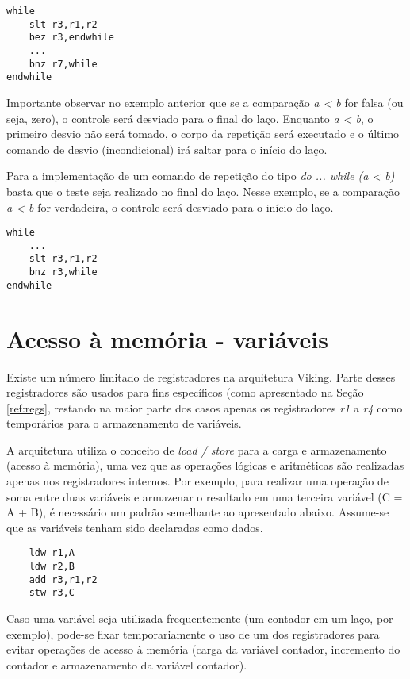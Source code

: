 \documentclass{extreport}
\begin{document}
\begin{verbatim}
while
    slt r3,r1,r2
    bez r3,endwhile
    ...
    bnz r7,while
endwhile
\end{verbatim}

Importante observar no exemplo anterior que se a comparação \textit{a < b} for falsa (ou seja, zero), o controle será desviado para o final do laço. Enquanto \textit{a < b}, o primeiro desvio não será tomado, o corpo da repetição será executado e o último comando de desvio (incondicional) irá saltar para o início do laço.

Para a implementação de um comando de repetição do tipo \textit{do { ... } while (a < b)} basta que o teste seja realizado no final do laço. Nesse exemplo, se a comparação \textit{a < b} for verdadeira, o controle será desviado para o início do laço.

\begin{verbatim}
while
    ...
    slt r3,r1,r2
    bnz r3,while
endwhile
\end{verbatim}

\section{Acesso à memória - variáveis}

Existe um número limitado de registradores na arquitetura Viking. Parte desses registradores são usados para fins específicos (como apresentado na Seção \ref{ref:regs}, restando na maior parte dos casos apenas os registradores \textit{r1} a \textit{r4} como temporários para o armazenamento de variáveis.

A arquitetura utiliza o conceito de \textit{load / store} para a carga e armazenamento (acesso à memória), uma vez que as operações lógicas e aritméticas são realizadas apenas nos registradores internos. Por exemplo, para realizar uma operação de soma entre duas variáveis e armazenar o resultado em uma terceira variável (C = A + B), é necessário um padrão semelhante ao apresentado abaixo. Assume-se que as variáveis tenham sido declaradas como dados.

\begin{verbatim}
    ldw r1,A
    ldw r2,B
    add r3,r1,r2
    stw r3,C
\end{verbatim}

Caso uma variável seja utilizada frequentemente (um contador em um laço, por exemplo), pode-se fixar temporariamente o uso de um dos registradores para evitar operações de acesso à memória (carga da variável contador, incremento do contador e armazenamento da variável contador).
\end{document}
